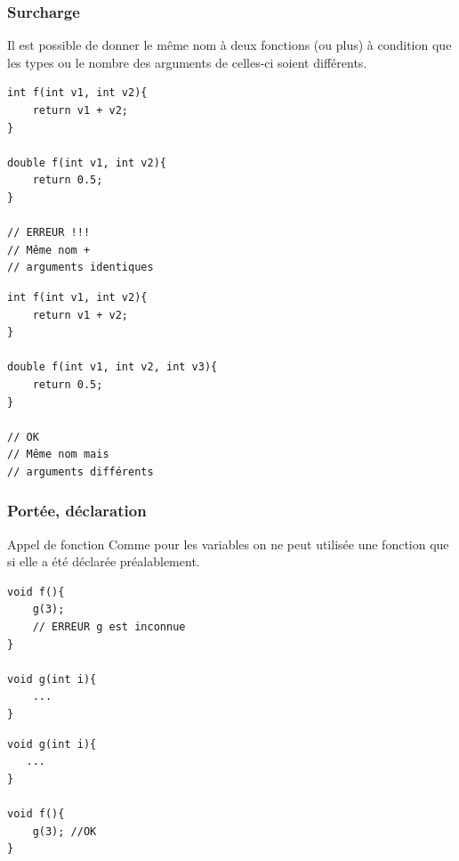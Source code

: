 \begin{frame}[fragile]
	\frametitle{Surcharge}
	Il est possible de donner le même nom à deux fonctions (ou plus) à condition que les types ou le nombre des arguments de celles-ci soient différents.
	\vfill
	\begin{minipage}{0.47\linewidth}
	\begin{verbatim}
int f(int v1, int v2){
    return v1 + v2;
}

double f(int v1, int v2){
    return 0.5;
}

// ERREUR !!!
// Même nom +
// arguments identiques
	\end{verbatim}
	\end{minipage}
	\hfill
	\begin{minipage}{0.47\linewidth}
	\begin{verbatim}
int f(int v1, int v2){
    return v1 + v2;
}

double f(int v1, int v2, int v3){
    return 0.5;
}

// OK
// Même nom mais
// arguments différents
	\end{verbatim}
	\end{minipage}

\end{frame}

\begin{frame}[fragile]
	\frametitle{Portée, déclaration}

	\begin{block}{Appel de fonction}
		Comme pour les variables on ne peut utilisée une fonction que si elle a été déclarée préalablement.
	\end{block}
	\vfill

	\begin{minipage}{0.47\linewidth}

	\begin{verbatim}
void f(){
    g(3);
    // ERREUR g est inconnue
}

void g(int i){
    ...
}
	\end{verbatim}
	\end{minipage}
	\hfill
	\begin{minipage}{0.47\linewidth}
	\begin{verbatim}
void g(int i){
   ...
}

void f(){
    g(3); //OK
}
	\end{verbatim}
	\end{minipage}
\end{frame}

